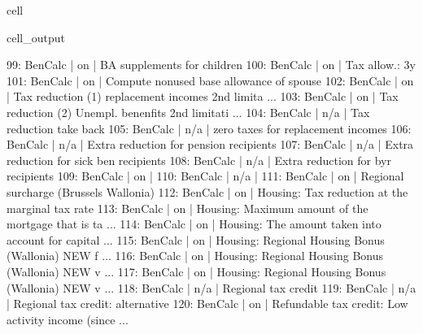 \documentclass[letterpaper,10pt,english]{sphinxmanual}
\begin{document}
\begin{sphinxuseclass}{cell}
\begin{sphinxuseclass}{cell_output}
\begin{sphinxVerbatim}[commandchars=\\\{\}]
99: BenCalc      | on                                                       |    BA supplements for children 
100: BenCalc     | on                                                       |    Tax allow.: \PYGZlt{}3y 
101: BenCalc     | on                                                       |    Compute non\PYGZhy{}used base allowance of spouse 
102: BenCalc     | on                                                       |    Tax reduction (1) replacement incomes \PYGZhy{} 2nd limita ... 
103: BenCalc     | on                                                       |    Tax reduction (2) Unempl. benenfits \PYGZhy{} 2nd limitati ... 
104: BenCalc     | n/a                                                      |    Tax reduction \PYGZhy{} take back 
105: BenCalc     | n/a                                                      |    zero taxes for replacement incomes 
106: BenCalc     | n/a                                                      |    Extra reduction for pension recipients 
107: BenCalc     | n/a                                                      |    Extra reduction for sick ben recipients 
108: BenCalc     | n/a                                                      |    Extra reduction for byr recipients 
109: BenCalc     | on                                                       |     
110: BenCalc     | n/a                                                      |     
111: BenCalc     | on                                                       |    Regional surcharge (Brussels \PYGZam{} Wallonia) 
112: BenCalc     | on                                                       |    Housing: Tax reduction at the marginal tax rate 
113: BenCalc     | on                                                       |    Housing: Maximum amount of the mortgage that is ta ... 
114: BenCalc     | on                                                       |    Housing: The amount taken into account for capital ... 
115: BenCalc     | on                                                       |    Housing: Regional Housing Bonus (Wallonia) NEW \PYGZhy{} f ... 
116: BenCalc     | on                                                       |    Housing: Regional Housing Bonus (Wallonia) NEW \PYGZhy{} v ... 
117: BenCalc     | on                                                       |    Housing: Regional Housing Bonus (Wallonia) NEW \PYGZhy{} v ... 
118: BenCalc     | n/a                                                      |    Regional tax credit 
119: BenCalc     | n/a                                                      |    Regional tax credit: alternative 
120: BenCalc     | on                                                       |    Refundable tax credit: Low activity income (since  ... 

\end{sphinxVerbatim}
\end{sphinxuseclass}
\end{sphinxuseclass}
\end{document}
